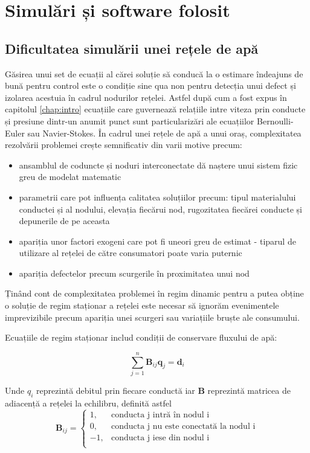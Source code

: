 \chapter{Simulări și software folosit}
\label{chap:simulari}

\section{Dificultatea simulării unei rețele de apă}

Găsirea unui set de ecuații al cărei soluție să conducă la o estimare îndeajuns de bună pentru control este o condiție sine qua non pentru detecția unui defect și izolarea acestuia în cadrul nodurilor rețelei. Astfel după cum a fost expus în capitolul \ref{chap:intro} ecuațiile care guvernează relațiile intre viteza prin conducte și presiune dintr-un anumit punct sunt particularizări ale ecuațiilor Bernoulli-Euler sau Navier-Stokes. În cadrul unei rețele de apă a unui oraș, complexitatea rezolvării problemei crește semnificativ din varii motive precum:
\begin{itemize}
\item ansamblul de coduncte și noduri interconectate dă naștere unui sistem fizic greu de modelat matematic
\item parametrii care pot influența calitatea soluțiilor precum: tipul materialului conductei și al nodului, elevația fiecărui nod, rugozitatea fiecărei conducte și depunerile de pe aceasta
\item apariția unor factori exogeni care pot fi uneori greu de estimat - tiparul de utilizare al rețelei de către consumatori poate varia puternic
\item apariția defectelor precum scurgerile în proximitatea unui nod
\end{itemize}

Ținând cont de complexitatea problemei în regim dinamic pentru a putea obține o soluție de regim staționar a rețelei este necesar să ignorăm evenimentele imprevizibile precum apariția unei scurgeri sau variațiile bruște ale consumului.

Ecuațiile de regim staționar includ condiții de conservare fluxului de apă:

\begin{equation}
\label{Ecuația de conservare a rețelei de apă}
\sum\limits_{j=1}^{n} \mathbf B_{ij}\mathbf q_j=\mathbf d_i
\end{equation}

Unde $q_i$ reprezintă debitul prin fiecare conductă iar \textbf{B} reprezintă matricea de adiacență a rețelei la echilibru, definită astfel
\begin{equation}
\textbf{B}_{ij} = 
     \begin{cases}
       1, & \text{conducta j intră în nodul i}\\
       0, & \text{conducta j nu este conectată la nodul i} \\
       -1, & \text{conducta j iese din nodul i}\\ 
     \end{cases}
\end{equation}

